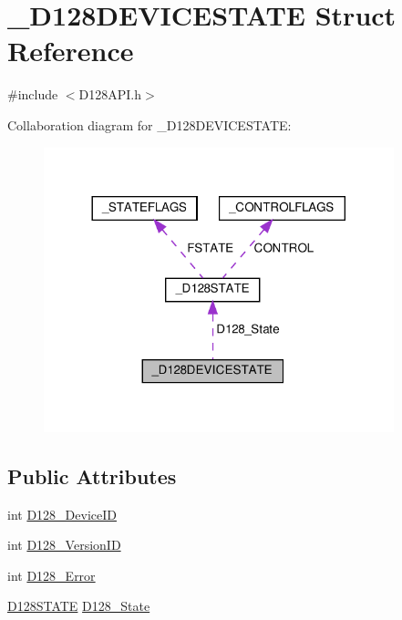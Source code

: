 \hypertarget{struct___d128_d_e_v_i_c_e_s_t_a_t_e}{}\section{\+\_\+\+D128\+D\+E\+V\+I\+C\+E\+S\+T\+A\+TE Struct Reference}
\label{struct___d128_d_e_v_i_c_e_s_t_a_t_e}


{\ttfamily \#include $<$D128\+A\+P\+I.\+h$>$}



Collaboration diagram for \+\_\+\+D128\+D\+E\+V\+I\+C\+E\+S\+T\+A\+TE\+:
\nopagebreak
\begin{figure}[H]
\begin{center}
\leavevmode
\includegraphics[width=288pt]{struct___d128_d_e_v_i_c_e_s_t_a_t_e__coll__graph}
\end{center}
\end{figure}
\subsection*{Public Attributes}
\begin{DoxyCompactItemize}
\item 
int \hyperlink{struct___d128_d_e_v_i_c_e_s_t_a_t_e_aab8e8a8b459ecc83ecb1e519e0df6e0b}{D128\+\_\+\+Device\+ID}
\item 
int \hyperlink{struct___d128_d_e_v_i_c_e_s_t_a_t_e_aa2ea21f882710c40dcac5e10a3c9da0a}{D128\+\_\+\+Version\+ID}
\item 
int \hyperlink{struct___d128_d_e_v_i_c_e_s_t_a_t_e_adae9dc9189afc64b47cee532eb0d3f73}{D128\+\_\+\+Error}
\item 
\hyperlink{_d128_a_p_i_8h_a37bd6b2ec1438a8cd6a28e7e6ff61885}{D128\+S\+T\+A\+TE} \hyperlink{struct___d128_d_e_v_i_c_e_s_t_a_t_e_a16e38dc259d46e4d7e729a9982044bfe}{D128\+\_\+\+State}
\end{DoxyCompactItemize}


